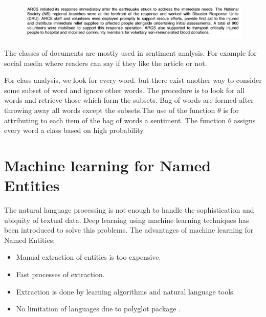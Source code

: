 {\centering{$\theta$}

\centering{$\Updownarrow$}   

\begin{figure}[hbtp]
\centering
\includegraphics[scale=0.5]{images/report.png}\label{report}
\end{figure}

{\centering{$\Updownarrow$}}

{}

}
The classes of documents are mostly used in sentiment analysis. For example for social media where readers can say if they like the article or not.

For class analysis, we look for every word. but there exist another way to consider some subset of word and ignore other words.
The procedure is to look for all words and retrieve those which form the subsets.  Bag of words are formed after throwing away  all words except the subsets.The use of the function $\theta$  is for  attributing  to each item of the bag of words a sentiment. The function $\theta$  assigns every word a class based on high probability.


\section{Machine learning for Named Entities\label{Chapter2}}
The natural language processing is not enough to handle the sophistication and ubiquity of textual data. Deep learning using machine learning techniques has been introduced to solve this problems. The advantages of machine learning for Named Entities:
\begin{itemize}
\item Manual extraction of entities is too expensive.
\item Fast processes of extraction.
\item Extraction is done by learning algorithms and natural language tools.
\item No limitation of languages due to polyglot package .
\end{itemize}





